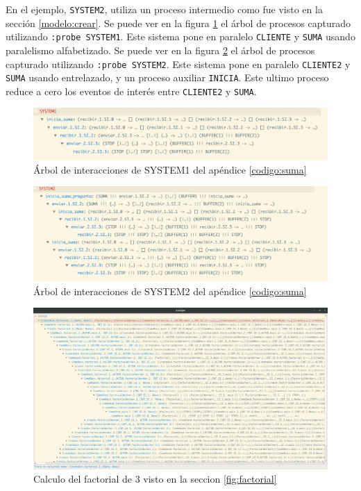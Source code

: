 En el ejemplo, \verb=SYSTEM2=, utiliza un proceso intermedio como fue visto en la sección \ref{modelo:crear}. Se puede ver en la figura \ref{modelo:suma:system1} el árbol de procesos capturado utilizando \verb=:probe SYSTEM1=. Este sistema pone en paralelo \verb-CLIENTE- y \verb-SUMA- usando paralelismo alfabetizado. Se puede ver en la figura \ref{modelo:suma:system2} el árbol de procesos capturado utilizando \verb=:probe SYSTEM2=. Este sistema pone en paralelo \verb-CLIENTE2- y \verb-SUMA- usando entrelazado, y un proceso auxiliar \verb-INICIA-. Este ultimo proceso reduce a cero los eventos de interés entre \verb-CLIENTE2- y \verb-SUMA-.

\begin{figure}[H]
\begin{center}
\includegraphics[width=15 cm]{img/sumasystem1.png}
\caption{Árbol de interacciones de SYSTEM1 del apéndice \ref{codigo:suma}}
\label{modelo:suma:system1}
\end{center}
\end{figure}

\begin{figure}[H]
\begin{center}
\includegraphics[width=15 cm]{img/sumasystem2.png}
\caption{Árbol de interacciones de SYSTEM2 del apéndice \ref{codigo:suma}}
\label{modelo:suma:system2}
\end{center}
\end{figure}

\begin{figure}
\begin{center}
\includegraphics[width=24 cm, angle=90]{img/fact.png}
\caption{Calculo del factorial de 3 visto en la seccion \ref{fig:factorial}}\label{modelo:grafo}
\end{center}
\end{figure}

